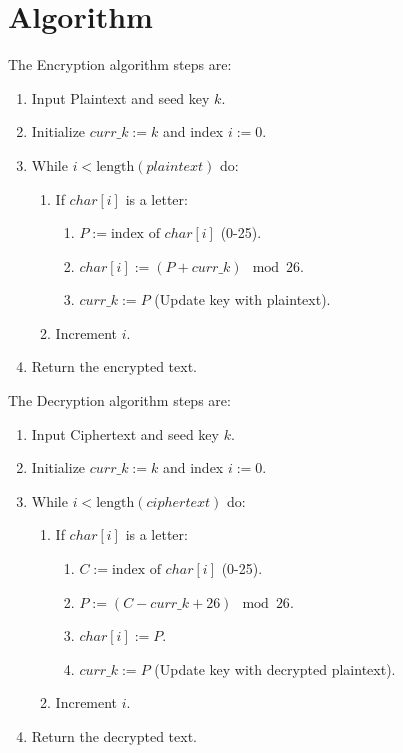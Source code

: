 \section{Algorithm}
The Encryption algorithm steps are:
\begin{enumerate}
  \item Input Plaintext and seed key $k$.
  \item Initialize $curr\_k := k$ and index $i := 0$.
  \item While $i < \text{length}(plaintext)$ do:
  \begin{enumerate}
    \item If $char[i]$ is a letter:
    \begin{enumerate}
      \item $P := \text{index of } char[i]$ (0-25).
      \item $char[i] := (P + curr\_k) \mod 26$.
      \item $curr\_k := P$ (Update key with plaintext).
    \end{enumerate}
    \item Increment $i$.
  \end{enumerate}
  \item Return the encrypted text.
\end{enumerate}

The Decryption algorithm steps are:
\begin{enumerate}
  \item Input Ciphertext and seed key $k$.
  \item Initialize $curr\_k := k$ and index $i := 0$.
  \item While $i < \text{length}(ciphertext)$ do:
  \begin{enumerate}
    \item If $char[i]$ is a letter:
    \begin{enumerate}
      \item $C := \text{index of } char[i]$ (0-25).
      \item $P := (C - curr\_k + 26) \mod 26$.
      \item $char[i] := P$.
      \item $curr\_k := P$ (Update key with decrypted plaintext).
    \end{enumerate}
    \item Increment $i$.
  \end{enumerate}
  \item Return the decrypted text.
\end{enumerate}

